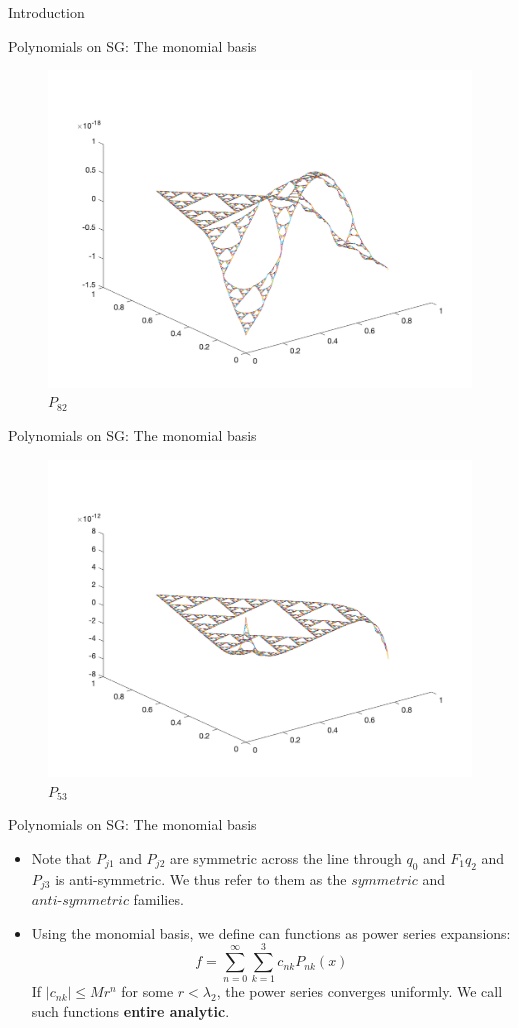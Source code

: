 \documentclass[xcolor = dvipsnames]{beamer}
\begin{document}
\begin{section}{Introduction}
\begin{frame}{Polynomials on SG: The monomial basis}
\begin{figure}[H]
        \includegraphics[width=0.75\linewidth]{monomial8_2.png}
        \caption{$P_{82}$}
        
    \end{figure}
    
\end{frame}

\begin{frame}{Polynomials on SG: The monomial basis}
    \begin{figure}[H]
        \centering
        \includegraphics[width=0.75\linewidth]{monomial5_3.png}
        \caption{$P_{53}$}
    \end{figure}
\end{frame}

\begin{frame}{Polynomials on SG: The monomial basis}
    \begin{itemize}
        \item Note that $P_{j1}$ and $P_{j2}$ are symmetric across the line through $q_0$ and $F_1q_2$ and $P_{j3}$ is anti-symmetric. We thus refer to them as the $\textit{symmetric}$ and $\textit{anti-symmetric}$ families. 
        \pause
        \item Using the monomial basis, we define can functions as power series expansions:
        $$ f = \sum_{n=0}^{\infty}\sum_{k=1}^{3}c_{nk}P_{nk}(x)$$
        If $|c_{nk}| \leq Mr^{n}$ for some $r
        < \lambda_2$, the power series converges uniformly. We call such functions \textbf{entire analytic}.
    \end{itemize}
    

\end{frame}
\end{section}
\end{document}
